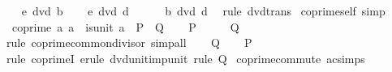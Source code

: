 \begin{isabellebody}
\ \ \isamarkupfalse%
\ {\isachardoublequoteopen}e\ dvd\ b{\isachardoublequoteclose}\ \isamarkupfalse%
\ \isamarkupfalse%
\ {\isachardoublequoteopen}e\ dvd\ d{\isachardoublequoteclose}\isanewline
\ \ \ \ \isamarkupfalse%
\ {\isacartoucheopen}b\ dvd\ d{\isacartoucheclose}\ \isamarkupfalse%
\ {\isacharparenleft}{\kern0pt}rule\ dvd{\isacharunderscore}{\kern0pt}trans{\isacharparenright}{\kern0pt}\isanewline
{}\isamarkupfalse%
%
\endisatagproof
{\isafoldproof}%
%
\isadelimproof
\isanewline
%
\endisadelimproof
\isanewline
{}\isamarkupfalse%
\ coprime{\isacharunderscore}{\kern0pt}self\ {\isacharbrackleft}{\kern0pt}simp{\isacharbrackright}{\kern0pt}{\isacharcolon}{\kern0pt}\isanewline
\ \ {\isachardoublequoteopen}coprime\ a\ a\ {\isasymlongleftrightarrow}\ is{\isacharunderscore}{\kern0pt}unit\ a{\isachardoublequoteclose}\ {\isacharparenleft}{\kern0pt}\ {\isachardoublequoteopen}{\isacharquery}{\kern0pt}P\ {\isasymlongleftrightarrow}\ {\isacharquery}{\kern0pt}Q{\isachardoublequoteclose}{\isacharparenright}{\kern0pt}\isanewline
%
\isadelimproof
%
\endisadelimproof
%
\isatagproof
{}\isamarkupfalse%
\isanewline
\ \ \isamarkupfalse%
\ {\isacharquery}{\kern0pt}P\isanewline
\ \ \isamarkupfalse%
\ \isamarkupfalse%
\ {\isacharquery}{\kern0pt}Q\isanewline
\ \ \ \ \isamarkupfalse%
\ {\isacharparenleft}{\kern0pt}rule\ coprime{\isacharunderscore}{\kern0pt}common{\isacharunderscore}{\kern0pt}divisor{\isacharparenright}{\kern0pt}\ simp{\isacharunderscore}{\kern0pt}all\isanewline
{}\isamarkupfalse%
\isanewline
\ \ \isamarkupfalse%
\ {\isacharquery}{\kern0pt}Q\isanewline
\ \ \isamarkupfalse%
\ {\isacharquery}{\kern0pt}P\isanewline
\ \ \ \ \isamarkupfalse%
\ {\isacharparenleft}{\kern0pt}rule\ coprimeI{\isacharparenright}{\kern0pt}\ {\isacharparenleft}{\kern0pt}erule\ dvd{\isacharunderscore}{\kern0pt}unit{\isacharunderscore}{\kern0pt}imp{\isacharunderscore}{\kern0pt}unit{\isacharcomma}{\kern0pt}\ rule\ {\isacartoucheopen}{\isacharquery}{\kern0pt}Q{\isacartoucheclose}{\isacharparenright}{\kern0pt}\isanewline
{}\isamarkupfalse%
%
\endisatagproof
{\isafoldproof}%
%
\isadelimproof
\isanewline
%
\endisadelimproof
\isanewline
{}\isamarkupfalse%
\ coprime{\isacharunderscore}{\kern0pt}commute\ {\isacharbrackleft}{\kern0pt}ac{\isacharunderscore}{\kern0pt}simps{\isacharbrackright}{\kern0pt}{\isacharcolon}{\kern0pt}\isanewline

\end{isabellebody}
